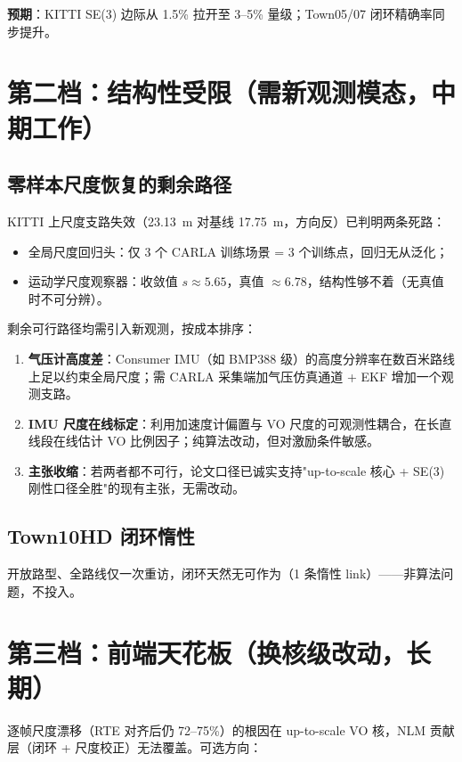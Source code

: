 \documentclass[11pt]{article}
\begin{document}
\textbf{预期}：KITTI SE(3) 边际从 1.5\% 拉开至 3--5\% 量级；Town05/07 闭环精确率同步提升。

\section{第二档：结构性受限（需新观测模态，中期工作）}

\subsection{零样本尺度恢复的剩余路径}

KITTI 上尺度支路失效（23.13~m 对基线 17.75~m，方向反）已判明两条死路：
\begin{itemize}[nosep]
  \item 全局尺度回归头：仅 3 个 CARLA 训练场景 = 3 个训练点，回归无从泛化；
  \item 运动学尺度观察器：收敛值 $s\approx5.65$，真值 $\approx6.78$，结构性够不着（无真值时不可分辨）。
\end{itemize}

剩余可行路径均需引入新观测，按成本排序：
\begin{enumerate}[nosep]
  \item \textbf{气压计高度差}：Consumer IMU（如 BMP388 级）的高度分辨率在数百米路线上足以约束全局尺度；需 CARLA 采集端加气压仿真通道 + EKF 增加一个观测支路。
  \item \textbf{IMU 尺度在线标定}：利用加速度计偏置与 VO 尺度的可观测性耦合，在长直线段在线估计 VO 比例因子；纯算法改动，但对激励条件敏感。
  \item \textbf{主张收缩}：若两者都不可行，论文口径已诚实支持"up-to-scale 核心 + SE(3) 刚性口径全胜"的现有主张，无需改动。
\end{enumerate}

\subsection{Town10HD 闭环惰性}

开放路型、全路线仅一次重访，闭环天然无可作为（1 条惰性 link）——非算法问题，不投入。

\section{第三档：前端天花板（换核级改动，长期）}

逐帧尺度漂移（RTE 对齐后仍 72--75\%）的根因在 up-to-scale VO 核，NLM 贡献层（闭环 + 尺度校正）无法覆盖。可选方向：
\end{document}
